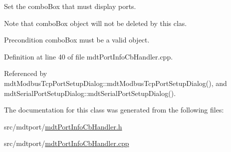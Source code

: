 Set the combo\-Box that must display ports. 

Note that combo\-Box object will not be deleted by this clas.

\begin{DoxyPrecond}{Precondition}
combo\-Box must be a valid object. 
\end{DoxyPrecond}


Definition at line 40 of file mdt\-Port\-Info\-Cb\-Handler.\-cpp.



Referenced by mdt\-Modbus\-Tcp\-Port\-Setup\-Dialog\-::mdt\-Modbus\-Tcp\-Port\-Setup\-Dialog(), and mdt\-Serial\-Port\-Setup\-Dialog\-::mdt\-Serial\-Port\-Setup\-Dialog().



The documentation for this class was generated from the following files\-:\begin{DoxyCompactItemize}
\item 
src/mdtport/\hyperlink{mdt_port_info_cb_handler_8h}{mdt\-Port\-Info\-Cb\-Handler.\-h}\item 
src/mdtport/\hyperlink{mdt_port_info_cb_handler_8cpp}{mdt\-Port\-Info\-Cb\-Handler.\-cpp}\end{DoxyCompactItemize}
